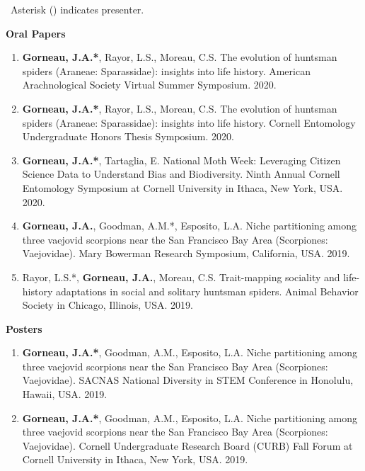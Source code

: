 
\bodyfontlight\tiny\item\ Asterisk (\text{*}) indicates presenter.

\color{darktext}\small\textbf{Oral Papers}
\begin{enumerate}
\bodyfontlight\scriptsize\item\textbf{Gorneau, J.A.*}, Rayor, L.S., Moreau, C.S. The evolution of huntsman spiders (Araneae: Sparassidae): insights into life history. American Arachnological Society Virtual Summer Symposium. 2020.
\bodyfontlight\scriptsize\item\textbf{Gorneau, J.A.*}, Rayor, L.S., Moreau, C.S. The evolution of huntsman spiders (Araneae: Sparassidae): insights into life history. Cornell Entomology Undergraduate Honors Thesis Symposium. 2020.
\bodyfontlight\scriptsize\item\textbf{Gorneau, J.A.*}, Tartaglia, E. National Moth Week: Leveraging Citizen Science Data to Understand Bias and Biodiversity. Ninth Annual Cornell Entomology Symposium at Cornell University in Ithaca, New York, USA. 2020.
\bodyfontlight\scriptsize\item\textbf{Gorneau, J.A.}, Goodman, A.M.*, Esposito, L.A. Niche partitioning among three vaejovid scorpions near the San Francisco Bay Area (Scorpiones: Vaejovidae). Mary Bowerman Research Symposium, California, USA. 2019.
\bodyfontlight\scriptsize\item\textbf{}Rayor, L.S.*, \textbf{Gorneau, J.A.}, Moreau, C.S. Trait-mapping sociality and life-history adaptations in social and solitary huntsman spiders. Animal Behavior Society in Chicago, Illinois, USA. 2019.
\end{enumerate}
\small\textbf{Posters}
\begin{enumerate}
\bodyfontlight\scriptsize\item\textbf{Gorneau, J.A.*}, Goodman, A.M., Esposito, L.A. Niche partitioning among three vaejovid scorpions near the San Francisco Bay Area (Scorpiones: Vaejovidae). SACNAS National Diversity in STEM Conference in Honolulu, Hawaii, USA. 2019.
\bodyfontlight\scriptsize\item\textbf{Gorneau, J.A.*}, Goodman, A.M., Esposito, L.A. Niche partitioning among three vaejovid scorpions near the San Francisco Bay Area (Scorpiones: Vaejovidae). Cornell Undergraduate Research Board (CURB) Fall Forum at Cornell University in Ithaca, New York, USA. 2019.
\end{enumerate}
